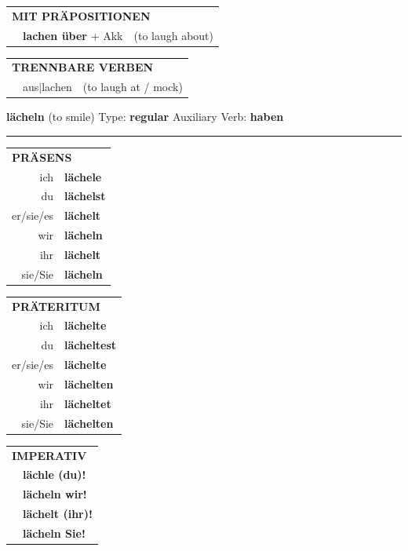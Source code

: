 \documentclass[10pt,a4paper]{revtex4-2}
\begin{document}
\begin{verbbox}
\vspace{10pt}

\begin{tabular}{lll}
\multicolumn{3}{l}{\textbf{MIT PRÄPOSITIONEN}}\\
& \textbf{lachen über} + Akk & (to laugh about)\\
\end{tabular}
\hfill
\begin{tabular}{lll}
\multicolumn{3}{l}{\textbf{TRENNBARE VERBEN}}\\
& aus$|$lachen & (to laugh at / mock)\\
\end{tabular}
\vspace{-5pt}
\end{verbbox}

\begin{verbbox}
{\Large \bf lächeln} (to smile) \hfill Type: \textbf{regular} \hfill Auxiliary Verb: \textbf{haben}

\vspace{5pt}
\hrule
\vspace{5pt}

\begin{tabular}{rl}
\multicolumn{2}{l}{\textbf{PRÄSENS}}\\
ich & \textbf{lächele}\\
du & \textbf{lächelst}\\
er/sie/es & \textbf{lächelt}\\
wir & \textbf{lächeln}\\
ihr & \textbf{lächelt}\\
sie/Sie & \textbf{lächeln}\\
\end{tabular}
\hfill
\begin{tabular}{rl}
\multicolumn{2}{l}{\textbf{PRÄTERITUM}}\\
ich & \textbf{lächelte}\\
du & \textbf{lächeltest}\\
er/sie/es & \textbf{lächelte}\\
wir & \textbf{lächelten}\\
ihr & \textbf{lächeltet}\\
sie/Sie & \textbf{lächelten}\\
\end{tabular}
\hfill
\begin{tabular}{rl}
\multicolumn{2}{l}{\textbf{IMPERATIV}}\\
& \textbf{lächle (du)!}\\
& \textbf{lächeln wir!}\\
& \textbf{lächelt (ihr)!}\\
& \textbf{lächeln Sie!}\\
\end{tabular}


\end{verbbox}
\end{document}

